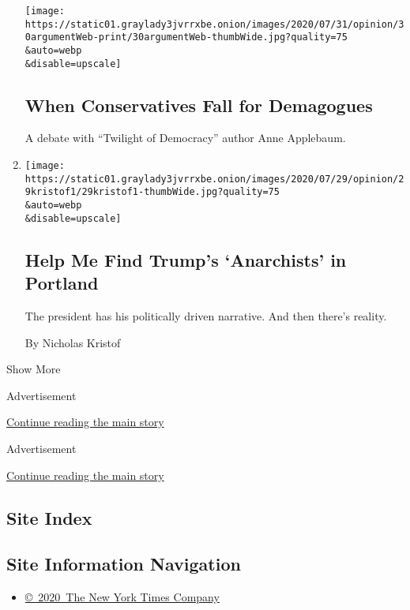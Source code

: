 \begin{enumerate}
  \texttt{[image: https://static01.graylady3jvrrxbe.onion/images/2020/07/31/opinion/30argumentWeb-print/30argumentWeb-thumbWide.jpg?quality=75\\\&auto=webp\\\&disable=upscale]}

  \hypertarget{when-conservatives-fall-for-demagogues}{%
  \subsection{When Conservatives Fall for
  Demagogues}\label{when-conservatives-fall-for-demagogues}}

  A debate with ``Twilight of Democracy'' author Anne Applebaum.
\item
  \href{/2020/07/29/opinion/portland-protests-trump.html}{}

  \texttt{[image: https://static01.graylady3jvrrxbe.onion/images/2020/07/29/opinion/29kristof1/29kristof1-thumbWide.jpg?quality=75\\\&auto=webp\\\&disable=upscale]}

  \hypertarget{help-me-find-trumps-anarchists-in-portland}{%
  \subsection{Help Me Find Trump's `Anarchists' in
  Portland}\label{help-me-find-trumps-anarchists-in-portland}}

  The president has his politically driven narrative. And then there's
  reality.

  By Nicholas Kristof
\end{enumerate}

Show More

Advertisement

\protect\hyperlink{after-mid2}{Continue reading the main story}

Advertisement

\protect\hyperlink{after-mktg}{Continue reading the main story}

\hypertarget{site-index}{%
\subsection{Site Index}\label{site-index}}

\hypertarget{site-information-navigation}{%
\subsection{Site Information
Navigation}\label{site-information-navigation}}

\begin{itemize}
\tightlist
\item
  \href{https://help.nytimes3xbfgragh.onion/hc/en-us/articles/115014792127-Copyright-notice}{©~2020~The
  New York Times Company}
\end{itemize}

